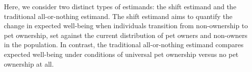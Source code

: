\documentclass[
  singlecolumn,
  9pt]{article}
\begin{document}
\begin{table}

\caption{\label{tbl-comparative-graph-cats}A comparison of the classical
causal estimand with the shift estimand employed in this study: cats and
sleep}


\end{table}%

\newpage{}

Here, we consider two distinct types of estimands: the shift estimand
and the traditional all-or-nothing estimand. The shift estimand aims to
quantify the change in expected well-being when individuals transition
from non-ownership to pet ownership, set against the current
distribution of pet owners and non-owners in the population. In
contrast, the traditional all-or-nothing estimand compares expected
well-being under conditions of universal pet ownership versus no pet
ownership at all.
\end{document}
